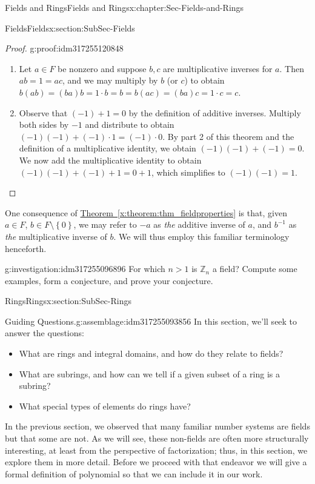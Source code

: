 \documentclass[oneside,10pt,]{book}
\newcommand{\xreffont}{\relax}
\numberwithin{equation}{section}
\newcommand{\set}[1]{\left\{ {#1} \right\}}
\def\Z{{\mathbb Z}}
\begin{document}
\begin{chapterptx}{Fields and Rings}{}{Fields and Rings}{}{}{x:chapter:Sec-Fields-and-Rings}
\begin{sectionptx}{Fields}{}{Fields}{}{}{x:section:SubSec-Fields}
\begin{proof}{}{g:proof:idm317255120848}
\begin{enumerate}
\item{}Let \(a\in F\) be nonzero and suppose \(b,c\) are multiplicative inverses for \(a\). Then \(ab = 1 = ac\), and we may multiply by \(b\) (or \(c\)) to obtain \(b(ab) = (ba)b = 1\cdot b = b = b(ac) = (ba)c = 1\cdot c = c\).%
\item{}Observe that \((-1) + 1 = 0\) by the definition of additive inverses. Multiply both sides by \(-1\) and distribute to obtain \((-1)(-1) + (-1)\cdot 1 = (-1)\cdot 0\). By part 2 of this theorem and the definition of a multiplicative identity, we obtain \((-1)(-1) + (-1) = 0\). We now add the multiplicative identity to obtain \((-1)(-1) + (-1) + 1 = 0 + 1\), which simplifies to \((-1)(-1) = 1\).%
\end{enumerate}
\end{proof}
One consequence of \hyperref[x:theorem:thm_fieldproperties]{Theorem~{\xreffont\ref{x:theorem:thm_fieldproperties}}} is that, given \(a\in F\), \(b\in F\setminus \set{0}\), we may refer to \(-a\) as \emph{the} additive inverse of \(a\), and \(b^{-1}\) as \emph{the} multiplicative inverse of \(b\). We will thus employ this familiar terminology henceforth.%
\begin{investigation}{}{g:investigation:idm317255096896}%
For which \(n > 1\) is \(\Z_n\) a field? Compute some examples, form a conjecture, and prove your conjecture.%
\end{investigation}
\end{sectionptx}
%
%
\typeout{************************************************}
\typeout{************************************************}
%
\begin{sectionptx}{Rings}{}{Rings}{}{}{x:section:SubSec-Rings}
\begin{assemblage}{Guiding Questions.}{g:assemblage:idm317255093856}%
In this section, we'll seek to answer the questions: %
\begin{itemize}[label=\textbullet]
\item{}What are rings and integral domains, and how do they relate to fields?%
\item{}What are subrings, and how can we tell if a given subset of a ring is a subring?%
\item{}What special types of elements do rings have?%
\end{itemize}
%
\end{assemblage}
In the previous section, we observed that many familiar number systems are fields but that some are not. As we will see, these non-fields are often more structurally interesting, at least from the perspective of factorization; thus, in this section, we explore them in more detail. Before we proceed with that endeavor we will give a formal definition of polynomial so that we can include it in our work.%

\end{sectionptx}
\end{chapterptx}
\end{document}
